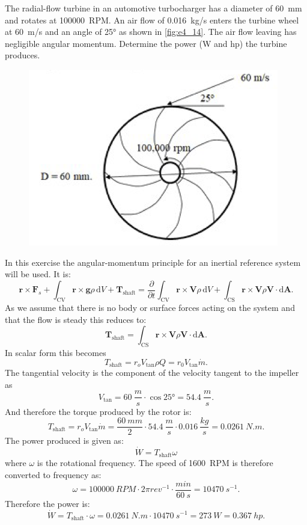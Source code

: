 The radial-flow turbine in an automotive turbocharger has a diameter of \qty{60}{mm} and rotates at \qty{100000}{RPM}. An air flow of \qty{0,016}{kg/s} enters the turbine wheel at \qty{60}{m/s} and an angle of \ang{25} as shown in \autoref{fig:e4_14}. The air flow leaving has negligible angular momentum. Determine the power (\unit{W} and \unit{hp}) the turbine produces.

\begin{figure} [ht]
  \centering
  \includegraphics[width=0.25\linewidth]{./figures/e4_14.png}
  \caption{}
  \label{fig:e4_14}
\end{figure}

\bigbreak
In this exercise the angular-momentum principle for an inertial reference system will be used. It is:
\[ 
\textbf{r} \times \textbf{F}_s + \int_{\mathrm{CV}} \textbf{r} \times \textbf{g} \rho \, \mathrm{d}V + \textbf{T}_{\mathrm{shaft}} = \frac{\partial }{\partial t} \int_{\mathrm{CV}} \textbf{r} \times \textbf{V} \rho \, \mathrm{d}V + \int_{\mathrm{CS}} \textbf{r} \times \textbf{V} \rho \textbf{V} \cdot \mathrm{d}\textbf{A}
.\]
As we assume that there is no body or surface forces acting on the system and that the flow is steady this reduces to:
\[ 
\textbf{T}_{\mathrm{shaft}} = \int_{\mathrm{CS}} \textbf{r} \times \textbf{V} \rho \textbf{V} \cdot \mathrm{d}\textbf{A}
.\]
In scalar form this becomes
\[ 
T_{\mathrm{shaft}} = r_o V_{\mathrm{tan}} \rho Q = r_0 V_{\mathrm{tan}} \dot{m}
.\]
The tangential velocity is the component of the velocity tangent to the impeller as
\[ 
V_{\mathrm{tan}} = \qty{60}{\frac{m}{s}} \cdot \cos \ang{25} = \qty{54,4}{\frac{m}{s}} 
.\]
And therefore the torque produced by the rotor is:
\[ 
T_{\mathrm{shaft}} = r_o V_{\mathrm{tan}} \dot{m} = \frac{\qty{60}{mm}}{2} \cdot \qty{54,4}{\frac{m}{s}} \cdot  \qty{0,016}{\frac{kg}{s}} = \qty{0,0261}{N.m} 
.\]
The power produced is given as:
\[ 
\dot{W} = T_{\mathrm{shaft}} \omega
\]
where $\omega$ is the rotational frequency. The speed of \qty{1600}{RPM} is therefore converted to frequency as:
\[ 
\omega = \qty{100000}{RPM} \cdot 2\pi \unit{rev^{-1}} \cdot \frac{\unit{min}}{\qty{60}{s}} = \qty{10470}{s^{-1}} 
.\]
Therefore the power is:
\[ 
\dot{W} = T_{\mathrm{shaft}} \cdot \omega = \qty{0,0261}{N.m} \cdot \qty{10470}{s^{-1}} = \qty{273}{W} = \qty{0,367}{hp} 
.\]

